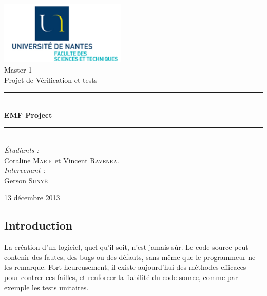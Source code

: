 \documentclass[a4paper]{article}
\newcommand{\HRule}{\rule{\linewidth}{0.5mm}}
\begin{document}
	\begin{titlepage}
		\begin{center}

			\includegraphics[width=0.45\textwidth]{UN-sciences.png}~\\[2cm]

			\LARGE{Master 1 }\\[1.5cm]

			\Large{Projet de Vérification et tests}\\[0.5cm]

			\HRule \\[0.4cm]
			{ \huge \bfseries EMF Project \\[0.4cm] }
			\HRule \\[1.5cm]

			\normalsize		
			\emph{\'Etudiants :}\\
			Coraline \textsc{Marie} et Vincent \textsc{Raveneau}\\
			\vspace{0.5cm}
			\emph{Intervenant :} \\
			Gerson \textsc{Sunyé}
		
			\vfill

			{\large 13 décembre 2013}

		\end{center}
	\end{titlepage}


	\renewcommand{\contentsname}{Sommaire}
	\tableofcontents
	\newpage


	\begin{center}
		\section{Introduction}
	\end{center}

	\vspace{0.5cm}

	La création d'un logiciel, quel qu'il soit, n'est jamais sûr. Le code source peut contenir des fautes, des bugs ou des défauts, sans même que le programmeur ne les remarque. Fort heureusement, il existe aujourd'hui des méthodes efficaces pour contrer ces failles, et renforcer la fiabilité du code source, comme par exemple les tests unitaires.
\end{document}
